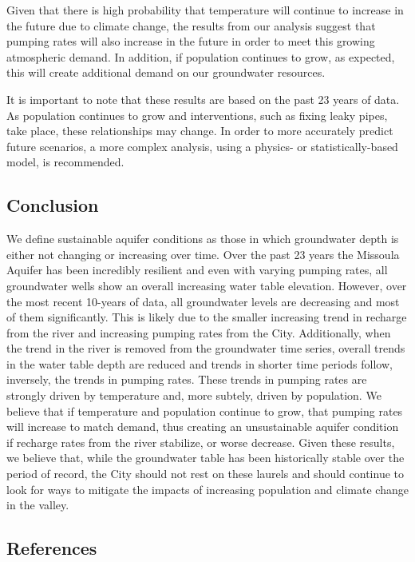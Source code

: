 \documentclass[
  letterpaper,
  DIV=11,
  numbers=noendperiod]{scrartcl}
\begin{document}
Given that there is high probability that temperature will continue to
increase in the future due to climate change, the results from our
analysis suggest that pumping rates will also increase in the future in
order to meet this growing atmospheric demand. In addition, if
population continues to grow, as expected, this will create additional
demand on our groundwater resources.

It is important to note that these results are based on the past 23
years of data. As population continues to grow and interventions, such
as fixing leaky pipes, take place, these relationships may change. In
order to more accurately predict future scenarios, a more complex
analysis, using a physics- or statistically-based model, is recommended.

\subsection{Conclusion}\label{conclusion}

We define sustainable aquifer conditions as those in which groundwater
depth is either not changing or increasing over time. Over the past 23
years the Missoula Aquifer has been incredibly resilient and even with
varying pumping rates, all groundwater wells show an overall increasing
water table elevation. However, over the most recent 10-years of data,
all groundwater levels are decreasing and most of them significantly.
This is likely due to the smaller increasing trend in recharge from the
river and increasing pumping rates from the City. Additionally, when the
trend in the river is removed from the groundwater time series, overall
trends in the water table depth are reduced and trends in shorter time
periods follow, inversely, the trends in pumping rates. These trends in
pumping rates are strongly driven by temperature and, more subtely,
driven by population. We believe that if temperature and population
continue to grow, that pumping rates will increase to match demand, thus
creating an unsustainable aquifer condition if recharge rates from the
river stabilize, or worse decrease. Given these results, we believe
that, while the groundwater table has been historically stable over the
period of record, the City should not rest on these laurels and should
continue to look for ways to mitigate the impacts of increasing
population and climate change in the valley.

\subsection{References}\label{references}
\end{document}
